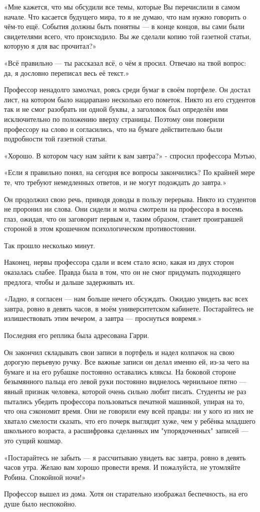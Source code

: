\documentclass[a4paper,12pt]{book}
\begin{document}
\par
«Мне кажется, что мы обсудили все темы, которые Вы перечислили в самом начале. Что касается будущего мира, то я не думаю, что нам нужно говорить о чём-то ещё. События должны быть понятны — в конце концов, вы сами были свидетелями всего, что происходило. Вы же сделали копию той газетной статьи, которую я для вас прочитал?»
\par
«Всё правильно — ты рассказал всё, о чём я просил. Отвечаю на твой вопрос: да, я дословно переписал весь её текст.»
\par
Профессор ненадолго замолчал, роясь среди бумаг в своём портфеле. Он достал лист, на котором было нацарапано несколько его пометок. Никто из его студентов так и не смог разобрать ни одной буквы, а заголовок был определён ими исключительно по положению вверху страницы. Поэтому они поверили профессору на слово и согласились, что на бумаге действительно были подробности той газетной статьи.
\par
«Хорошо. В котором часу нам зайти к вам завтра?» - спросил профессора Мэтью,
\par
«Если я правильно понял, на сегодня все вопросы закончились? По крайней мере те, что требуют немедленных ответов, и не могут подождать до завтра.»
\par
Он продолжил свою речь, приводя доводы в пользу перерыва. Никто из студентов не проронил ни слова. Они сидели и молча смотрели на профессора в восемь глаз, ожидая, что он заговорит первым и, таким образом, станет проигравшей стороной в этом крошечном психологическом противостоянии.
\par
Так прошло несколько минут.
\par
Наконец, нервы профессора сдали и всем стало ясно, какая из двух сторон оказалась слабее. Правда была в том, что он не смог придумать подходящего предлога, чтобы и дальше задерживать их.
\par
«Ладно, я согласен — нам больше нечего обсуждать. Ожидаю увидеть вас всех завтра, ровно в девять часов, в моём университетском кабинете. Постарайтесь не излишествовать этим вечером, а завтра — проснуться вовремя.»
\par
Последняя его реплика была адресована Гарри.
\par
Он закончил складывать свои записи в портфель и надел колпачок на свою дорогую перьевую ручку. Все важные записи он делал именно ей, из-за чего на бумаге и на его рубашке постоянно оставались кляксы. На боковой стороне безымянного пальца его левой руки постоянно виднелось чернильное пятно — явный признак человека, которой очень сильно любит писать. Студенты не раз пытались убедить профессора пользоваться печатной машинкой, упирая на то, что она сэкономит время. Они не говорили ему всей правды: ни у кого из них не хватало смелости сказать, что его почерк выглядит хуже, чем у ребёнка младшего школьного возраста, а расшифровка сделанных им "упорядоченных" записей — это сущий кошмар.
\par
«Постарайтесь не забыть — я рассчитываю увидеть вас завтра, ровно в девять часов утра. Желаю вам хорошо провести время. И пожалуйста, не утомляйте Робина. Спокойной ночи!»
\par
Профессор вышел из дома. Хотя он старательно изображал беспечность, на его душе было неспокойно.
\end{document}
